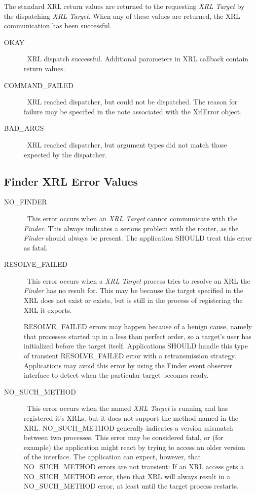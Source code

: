 \documentclass[11pt]{article}
\makeatletter
\newcommand{\finder} {{\em Finder}\@\xspace}
\newcommand{\xt} {{\em XRL Target}\@\xspace}
\makeatother
\begin{document}
The standard XRL return values are returned to the requesting \xt by
the dispatching \xt.  When any of these values are returned, the XRL
communication has been successful.

\begin{description}
\item [OKAY] \
XRL dispatch successful.  Additional parameters in
XRL callback contain return values.

\item [COMMAND\_FAILED] \
XRL reached dispatcher, but could not be
dispatched. The reason for failure may be specified in the note
associated with the XrlError object.

\item [BAD\_ARGS] \
XRL reached dispatcher, but argument types did not match those
expected by the dispatcher.

\end{description}

\subsection*{Finder XRL Error Values}

\begin{description}
\item [NO\_FINDER] \
This error occurs when an \xt cannot communicate
with the \finder. This always indicates a serious problem with the
router, as the \finder should always be present. The application
SHOULD treat this error as fatal.

\item [RESOLVE\_FAILED] \
This error occurs when a \xt process tries to
resolve an XRL the \finder has no result for.  This may be because the
target specified in the XRL does not exist or exists, but is still in
the process of registering the XRL it exports.

RESOLVE\_FAILED errors may happen because of a benign cause, namely
that processes started up in a less than perfect order, so a target's
user has initialized before the target itself. Applications SHOULD
handle this type of transient RESOLVE\_FAILED error with a
retransmission strategy.  Applications may avoid this error by using
the Finder event observer interface to detect when the particular
target becomes ready.

\item [NO\_SUCH\_METHOD] \
This error occurs when the named \xt is running and has registered
it's XRLs, but it does not support the method named in the XRL.
NO\_SUCH\_METHOD generally indicates a version mismatch between two
processes. This error may be considered fatal, or (for example) the
application might react by trying to access an older version of the
interface. The application can expect, however, that NO\_SUCH\_METHOD
errors are not transient: If an XRL access gets a NO\_SUCH\_METHOD
error, then that XRL will always result in a NO\_SUCH\_METHOD error,
at least until the target process restarts.

\end{description}
\end{document}
